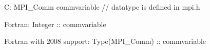 C:
MPI_Comm commvariable // datatype is defined in mpi.h

Fortran:
Integer :: commvariable

Fortran with 2008 support:
Type(MPI_Comm) :: commvariable
